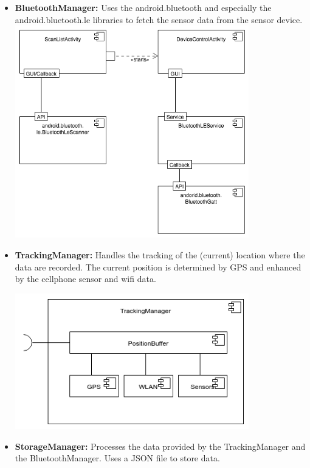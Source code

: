 \begin{itemize}
  \item \textbf{BluetoothManager:} Uses the android.bluetooth and especially the android.bluetooth.le libraries to fetch the sensor data from the sensor device. \\

 \includegraphics[width=0.8\textwidth]{pics/ble_man.png}

  \item \textbf{TrackingManager:} Handles the tracking of the (current) location where the data are recorded. The current position is determined by GPS and enhanced by the cellphone sensor and wifi data.

 \includegraphics[width=0.8\textwidth]{pics/TrackingManager_Composition.png}

  \item \textbf{StorageManager:} Processes the data provided by the TrackingManager and the BluetoothManager. Uses a JSON file to store data.


\end{itemize}
